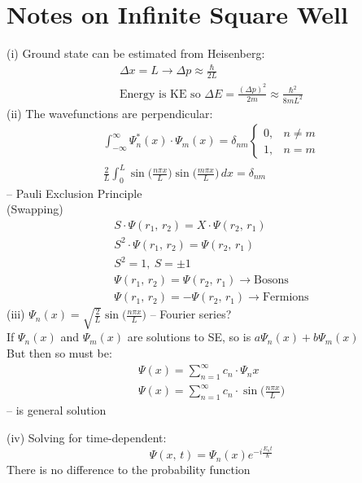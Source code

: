 \documentclass[a4paper, 11pt, fleqn, normalem]{report}
\begin{document}
\section{Notes on Infinite Square Well}
(i) Ground state can be estimated from Heisenberg:
\begin{gather*}
    \Delta x = L \rightarrow \Delta p \approx \frac{\hbar}{2L} \\
    \text{Energy is KE so }\Delta E = \frac{(\Delta p)^{2}}{2m} \approx \frac{\hbar^{2}}{8mL^{2}}
\end{gather*}
(ii) The wavefunctions are perpendicular:
\begin{gather*}
    \int_{-\infty}^{\infty} \Psi_{n}^{\ast}(x)\cdot\Psi_{m}(x) = \delta_{nm}
    \begin{cases}
        0, & n \neq m \\
        1, & n = m
    \end{cases} \\
    \frac{2}{L}\int_{0}^{L}\sin\Big(\frac{n\pi x}{L}\Big)\sin\Big(\frac{m\pi x}{L}\Big)\,dx = \delta_{nm}
\end{gather*}
-- Pauli Exclusion Principle \\
(Swapping)
\begin{gather*}
    S\cdot\Psi(r_{1},\,r_{2}) = X\cdot\Psi(r_{2},\,r_{1}) \\
    S^{2}\cdot\Psi(r_{1},\,r_{2}) = \Psi(r_{2},\,r_{1}) \\
    S^{2} = 1,~S = \pm 1 \\
    \Psi(r_{1},\,r_{2}) = \Psi(r_{2},\,r_{1}) \rightarrow \text{Bosons} \\
    \Psi(r_{1},\,r_{2}) = -\Psi(r_{2},\,r_{1}) \rightarrow \text{Fermions}
\end{gather*}
(iii) $\Psi_{n}(x) = \sqrt{\frac{2}{L}}\sin\Big(\frac{n\pi x}{L}\Big)$ -- Fourier series? \\
If $\Psi_{n}(x)$ and $\Psi_{m}(x)$ are solutions to SE, so is $a\Psi_{n}(x) + b\Psi_{m}(x)$ \\
But then so must be:
\begin{gather*}
    \Psi(x) = \sum_{n = 1}^{\infty} c_{n}\cdot\Psi_{n}{x} \\
    \Psi(x) = \sum_{n = 1}^{\infty} c_{n}\cdot\sin\Big(\frac{n\pi x}{L}\Big)
\end{gather*}
-- is general solution

(iv) Solving for time-dependent:
\begin{equation*}
    \Psi(x,\,t) = \Psi_{n}(x)e^{-i\tfrac{E_{n}t}{\hbar}}
\end{equation*}
There is no difference to the probability function
\end{document}
